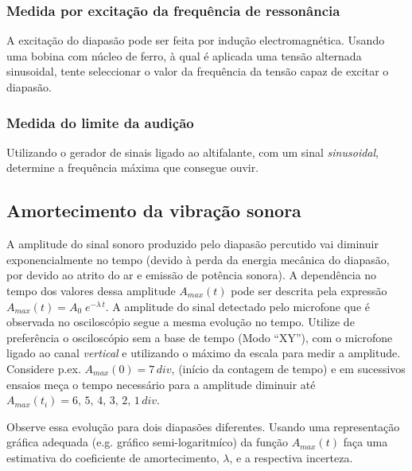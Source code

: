 \documentclass[a4paper,12pt]{article}      %
\begin{document}
\subsubsection{\sf Medida por excitação da frequência de ressonância }
A excitação do diapasão pode ser feita por indução electromagnética. Usando uma bobina com núcleo de ferro, à qual é aplicada uma tensão alternada sinusoidal, tente seleccionar o valor da frequência da tensão capaz de excitar o diapasão.
\subsubsection{\sf Medida do limite da audição}
Utilizando o gerador de sinais ligado ao  altifalante, com um sinal \emph{sinusoidal}, determine a frequência máxima que consegue ouvir.

\subsection{\sf Amortecimento da vibração sonora}

A amplitude do sinal sonoro produzido pelo diapasão percutido vai diminuir exponencialmente no tempo (devido à perda da energia mecânica do diapasão, por devido ao atrito do ar e  emissão de potência sonora). A dependência no tempo dos valores dessa amplitude $A_{max}(t)$  pode ser descrita pela expressão $A_{max}(t) = A_0 \; e^{-\lambda\,t}$. A amplitude do sinal detectado pelo microfone que é observada no osciloscópio segue a mesma evolução no tempo. 
Utilize de preferência o osciloscópio sem a base de tempo (Modo “XY”), com o microfone ligado ao canal \emph{vertical} e utilizando o máximo da escala para medir a amplitude. Considere p.ex. $A_{max}(0) = 7\,div$, (início da contagem de tempo) e em sucessivos ensaios meça o tempo necessário para a amplitude diminuir até  $A_{max}(t_i) = 6,\,5,\,4,\,3,\,2,\,1\,div$.

Observe essa evolução para dois diapasões diferentes.
Usando uma representação gráfica adequada (e.g. gráfico semi-logaritmíco) da função $A_{max}(t)$  faça uma estimativa do coeficiente de amortecimento, $\lambda$, e a respectiva incerteza.
\end{document}

